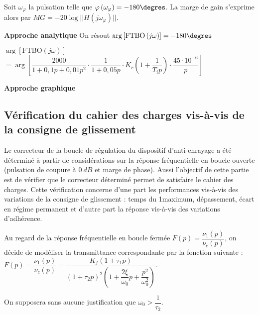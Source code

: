 \begin{multicols}{2}
\begin{methode}
Soit $\omega_{\varphi}$ la pulsation telle que $\varphi\left(\omega_{\varphi} \right)=-180\degres$. La marge de gain s'exprime alors par $MG=-20\log||H\left(j \omega_{\varphi} \right)||$.
\end{methode}


\begin{corrige}
\textbf{Approche analytique}
On résout $\arg \left[\text{FTBO}\left( j \omega\right)\right] = -180 \degres$ 


$\arg \left[\text{FTBO}\left( j \omega\right)\right]$ 
$ = \arg \left[
\dfrac{2000}{1+0,1p+0,01p^2}
\cdot
\dfrac{1}{1+0,05p}
\cdot 
K_r
 \left(1+\dfrac{1}{T_i p} \right) \cdot 
\dfrac{45\cdot 10^{-6}}{p}
\right] $


\textbf{Approche graphique}

\end{corrige}
\else
\fi

\subsection*{Vérification du cahier des charges vis-à-vis de la consigne de glissement}
\ifprof
\else
Le correcteur de la boucle de régulation du dispositif d’anti-enrayage a été déterminé
à partir de considérations sur la réponse fréquentielle en boucle ouverte
(pulsation de coupure à $\SI{0}{dB}$ et marge de phase). Aussi l’objectif de cette partie
est de vérifier que le correcteur déterminé permet de satisfaire le cahier des charges.
Cette vérification concerne d’une part les performances vis-à-vis des variations
de la consigne de glissement : temps du 1\ier maximum, dépassement, écart
en régime permanent et d’autre part la réponse vis-à-vis des variations d’adhérence.

Au regard de la réponse fréquentielle en boucle fermée $F(p)=\dfrac{\nu_1(p)}{\nu_c(p)}$, on
décide de modéliser la transmittance correspondante par la fonction suivante :
$ F(p)=\dfrac{\nu_1(p)}{\nu_c(p)}=\dfrac{K_f\left( 1+\tau_1 p\right)}{\left( 1+\tau_2 p\right)^2 \left({1+\dfrac{2 \xi }{\omega_0}p+\dfrac{p^2}{\omega_0^2}} \right)} $.

On supposera sans aucune justification que $\omega_0 > \dfrac{1}{\tau_2}$.

\fi


\end{multicols}
